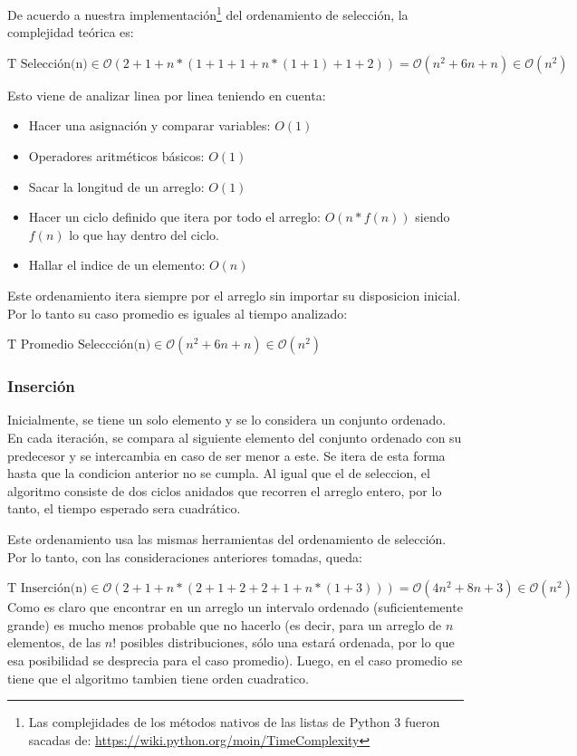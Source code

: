 \documentclass[article,a4paper]{article}
\newcommand{\bigO}{\mathcal{O}}
\begin{document}
De acuerdo a nuestra implementación\footnote{Las complejidades de los métodos nativos de las listas de Python 3 fueron sacadas de: \url{https://wiki.python.org/moin/TimeComplexity}} del ordenamiento de selección, la complejidad teórica es:

$\mbox{T Selección(n)} \in \bigO(2 + 1 + n * (1 + 1 + 1 + n * (1 + 1) + 1 + 2)) = \bigO(n^2 + 6n + n) \in \bigO(n^2)$

Esto viene de analizar linea por linea teniendo en cuenta:
\begin{itemize}
\item Hacer una asignación y comparar variables: $O(1)$
\item Operadores aritméticos básicos: $O(1)$
\item Sacar la longitud de un arreglo: $O(1)$
\item Hacer un ciclo definido que itera por todo el arreglo: $O(n * f(n))$ siendo $f(n)$ lo que hay dentro del ciclo.
\item Hallar el indice de un elemento: $O(n)$
\end{itemize}

Este ordenamiento itera siempre por el arreglo sin importar su disposicion inicial. Por lo tanto su caso promedio es iguales al tiempo analizado:

$\mbox{T Promedio Seleccción(n)} \in \bigO(n^2 + 6n + n) \in \bigO(n^2)$


\subsubsection{Inserción}

Inicialmente, se tiene un solo elemento y se lo considera un conjunto ordenado. En cada iteración, se compara al siguiente elemento del conjunto ordenado con su predecesor y se intercambia en caso de ser menor a este. Se itera de esta forma hasta que la condicion anterior no se cumpla. Al igual que el de seleccion, el algoritmo consiste de dos ciclos anidados que recorren el arreglo entero, por lo tanto, el tiempo esperado sera cuadrático.

Este ordenamiento usa las mismas herramientas del ordenamiento de selección. Por lo tanto, con las consideraciones anteriores tomadas, queda:

$\mbox{T Inserción(n)} \in \bigO( 2 + 1 + n * (2 + 1 + 2 + 2 + 1 + n * (1 + 3))) = \bigO(4n^2 + 8n + 3) \in \bigO(n^2)$\\

Como es claro que encontrar en un arreglo un intervalo ordenado (suficientemente grande) es mucho menos probable que no hacerlo (es decir, para un arreglo de $n$ elementos, de las $n!$ posibles distribuciones, sólo una estará  ordenada,  por lo que esa posibilidad se desprecia para el caso promedio). Luego, en el caso promedio se tiene que el algoritmo tambien tiene orden cuadratico.
\end{document}
